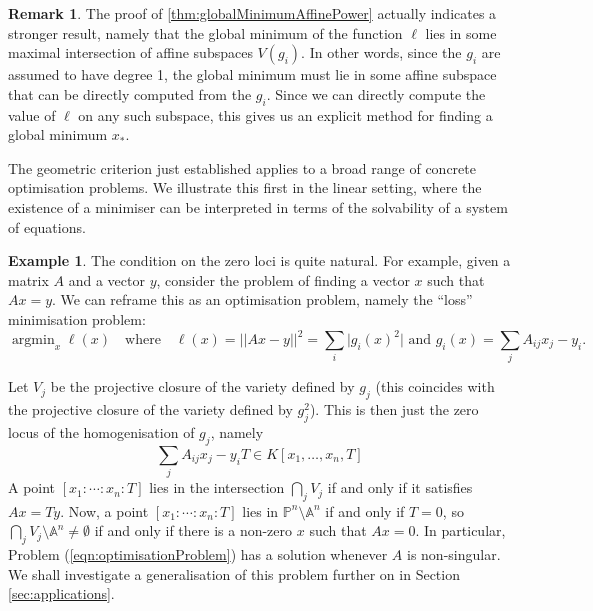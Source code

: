 \documentclass[10pt]{article}
\theoremstyle{definition}
\newtheorem{remark}[theorem]{Remark}
\newtheorem{example}[theorem]{Example}
\DeclareMathOperator*{\argmin}{\text{argmin}}
\begin{document}
\begin{remark} \label{rmk:minimumInMaxiamlAffineSubspace}
  The proof of \cref{thm:globalMinimumAffinePower} actually indicates a stronger result, namely that the global minimum of the function $\ell$ lies in some maximal intersection of affine subspaces
  $
  V (g_i).
  $
  In other words, since the $g_i$ are assumed to have degree 1, the global minimum must lie in some affine subspace that can be directly computed from the $g_i$. 
  Since we can directly compute the value of $\ell$ on any such subspace, this gives us an explicit method for finding a global minimum $x_*$. 
\end{remark}

The geometric criterion just established applies to a broad range of concrete optimisation problems. We illustrate this first in the linear setting, where the existence of a minimiser can be interpreted in terms of the solvability of a system of equations.

\begin{example} \label{ex:linearPreimage}
    The condition on the zero loci is quite natural. For example, given a matrix $A$ and a vector $y$, consider the problem of finding a vector $x$ such that $Ax = y$. We can reframe this as an optimisation problem, namely the ``loss'' minimisation problem:
    \begin{equation} \label{eqn:optimisationProblem}
        \argmin_x \ell (x) \quad \text{where}\quad
        \ell(x) = \lvert \lvert A x - y \rvert \rvert ^ 2 = \sum_i \lvert g_i(x) ^ 2 \rvert \text{ and } g_i(x) = \sum_j A_{ij} x_j - y_i.
    \end{equation}

    Let $V_j$ be the projective closure of the variety defined by $g_j$ (this coincides with the projective closure of the variety defined by $g_j^2$). This is then just the zero locus of the homogenisation of $g_j$, namely 
    $$
        \sum_j A_{ij} x_j - y_i T \in K[x_1, \dotsc, x_n, T]
    $$
    A point $[x_1 : \dotsb : x_n : T]$ lies in the intersection $\bigcap_j V_j$ if and only if it satisfies 
    $
        A x = T y.
    $
    Now, a point $[x_1 : \dotsb : x_n : T]$ lies in $\mathbb{P} ^ n \setminus \mathbb{A}^n$ if and only if $T = 0$, so $\bigcap_j V_j \setminus \mathbb{A}^n \ne \emptyset$ if and only if there is a non-zero $x$ such that $A x = 0$. In particular, Problem (\ref{eqn:optimisationProblem}) has a solution whenever $A$ is non-singular. We shall investigate a generalisation of this problem further on in Section \ref{sec:applications}.
\end{example}
\end{document}
